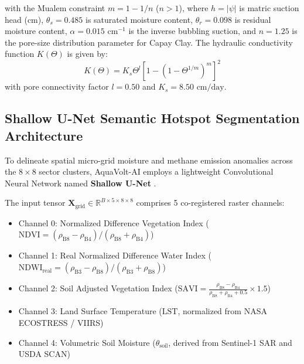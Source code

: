 \documentclass[sn-mathphys-num,Numbered]{sn-jnl}
\begin{document}
with the Mualem constraint $m = 1 - 1/n$ ($n > 1$), where $h = |\psi|$ is matric suction head ($\text{cm}$), $\theta_s = 0.485$ is saturated moisture content, $\theta_r = 0.098$ is residual moisture content, $\alpha = 0.015\text{ cm}^{-1}$ is the inverse bubbling suction, and $n = 1.25$ is the pore-size distribution parameter for Capay Clay. The hydraulic conductivity function $K(\Theta)$ is given by:
\begin{equation}
K(\Theta) = K_s \Theta^l \left[ 1 - \left( 1 - \Theta^{1/m} \right)^m \right]^2 \label{eq:van_genuchten_k}
\end{equation}
with pore connectivity factor $l = 0.50$ and $K_s = 8.50\text{ cm/day}$.

\subsection{Shallow U-Net Semantic Hotspot Segmentation Architecture}\label{sec:methods_unet}
To delineate spatial micro-grid moisture and methane emission anomalies across the $8 \times 8$ sector clusters, AquaVolt-AI employs a lightweight Convolutional Neural Network named \textbf{Shallow U-Net} \cite{Ronneberger2015,Badrinarayanan2017}.

The input tensor $\mathbf{X}_{\text{grid}} \in \mathbb{R}^{B \times 5 \times 8 \times 8}$ comprises 5 co-registered raster channels:
\begin{itemize}
    \item Channel 0: Normalized Difference Vegetation Index ($\mathrm{NDVI} = (\rho_{\text{B8}} - \rho_{\text{B4}})/(\rho_{\text{B8}} + \rho_{\text{B4}})$)
    \item Channel 1: Real Normalized Difference Water Index ($\mathrm{NDWI}_{\text{real}} = (\rho_{\text{B3}} - \rho_{\text{B8}})/(\rho_{\text{B3}} + \rho_{\text{B8}})$)
    \item Channel 2: Soil Adjusted Vegetation Index ($\mathrm{SAVI} = \frac{\rho_{\text{B8}} - \rho_{\text{B4}}}{\rho_{\text{B8}} + \rho_{\text{B4}} + 0.5} \times 1.5$)
    \item Channel 3: Land Surface Temperature ($\mathrm{LST}$, normalized from NASA ECOSTRESS / VIIRS)
    \item Channel 4: Volumetric Soil Moisture ($\theta_{\text{soil}}$, derived from Sentinel-1 SAR and USDA SCAN)
\end{itemize}
\end{document}
